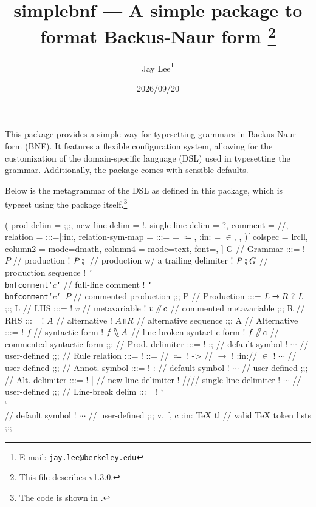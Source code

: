 \documentclass[11pt]{article}
\title{%
  \textsf{simplebnf} --- A simple package to format Backus-Naur form%
  \footnote{This file describes v1.3.0.}}
\author{Jay Lee\footnote{E-mail: %
  \href{mailto:jay.lee@berkeley.edu}{\texttt{jay.lee@berkeley.edu}}}}
\date{2026/09/20}
\begin{document}
\maketitle


\vfill
This package provides a simple way for typesetting grammars in Backus-Naur form (BNF).
It features a flexible configuration system, allowing for the customization of the domain-specific language (DSL) used in typesetting the grammar.
Additionally, the package comes with sensible defaults.

Below is the metagrammar of the DSL as defined in this package, which is typeset using the package itself.\footnote{The code is shown in .}
\def\colonincolon{:in:}
\def\doubleslash{//}
\def\doublebslash{\char`\\\char`\\}
\def\metabnfcomment{\char`\\bnfcomment}
\begin{tcolorbox}
  \begin{center}
    \begin{bnf}(
      prod-delim = ;;;,
      new-line-delim = !,
      single-line-delim = ?,
      comment = //,
      relation = {:::=|:in:},
      relation-sym-map =
        {
          {:::=} = $\Coloneqq$,
          {:in:} = $\in$,
        },
    )[
      colspec = lrcll,
      column{2} = {mode=dmath},
      column{4} = {mode=text, font=\ttfamily},
    ]
      G // Grammar :::=
      ! $P$ // production
      ! $P \fatsemi {}$ // production w/ a trailing delimiter
      ! $P \fatsemi G$ // production sequence
      ! \texttt{\metabnfcomment\char`{$c$\char`}} // full-line comment
      ! \texttt{\metabnfcomment\char`{$c$\char`}\,$P$} // commented production
    ;;;
      P // Production :::= $L \rightarrowtriangle R$ ? $L$
    ;;;
      L // LHS :::=
      ! $v$ // metavariable
      ! $v\!\fatslash\,c$ // commented metavariable
    ;;;
      R // RHS :::=
      ! $A$ // alternative
      ! $A \talloblong R$ // alternative sequence
    ;;;
      A // Alternative :::=
      ! $f$ // syntactic form
      ! $f\fatbslash A$ // line-broken syntactic form
      ! $f\!\fatslash\,c$ // commented syntactic form
    ;;;
      \fatsemi // Prod. delimiter :::=
      ! ;; // default symbol
      ! $\cdots$ // user-defined
    ;;;
      \rightarrowtriangle // Rule relation :::=
      ! ::= // $\Coloneqq$
      ! -> // $\to$
      ! \colonincolon // $\in$
      ! $\cdots$ // user-defined
    ;;;
      \fatslash // Annot. symbol :::=
      ! : // default symbol
      ! $\cdots$ // user-defined
    ;;;
      \talloblong // Alt. delimiter :::=
      ! | // new-line delimiter
      ! \doubleslash // single-line delimiter
      ! $\cdots$ // user-defined
    ;;;
      \fatbslash // Line-break delim :::=
      ! \doublebslash // default symbol
      ! $\cdots$ // user-defined
    ;;;
      v, f, c :in: \textsf{\TeX{} tl} // valid \TeX{} token lists
    ;;;
    \end{bnf}
  \end{center}
\end{tcolorbox}
\vfill
\end{document}
